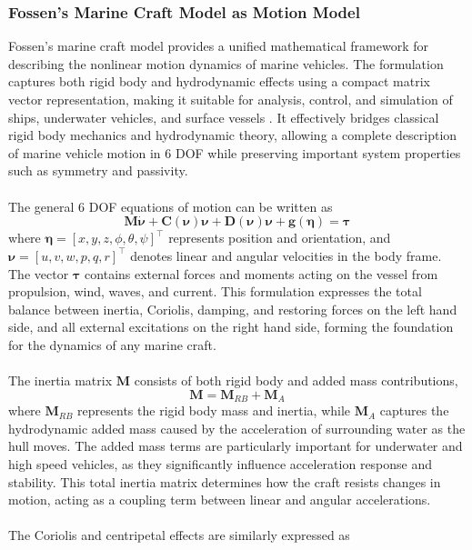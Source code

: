 \subsubsection{Fossen's Marine Craft Model as Motion Model}
Fossen's marine craft model provides a unified mathematical framework for describing the nonlinear motion dynamics of marine vehicles. The formulation captures both rigid body and hydrodynamic effects using a compact matrix vector representation, making it suitable for analysis, control, and simulation of ships, underwater vehicles, and surface vessels \cite{fossen_marine_craft_model}. It effectively bridges classical rigid body mechanics and hydrodynamic theory, allowing a complete description of marine vehicle motion in 6 DOF while preserving important system properties such as symmetry and passivity.  
\\ \\
The general 6 DOF equations of motion can be written as
$$
    \mathbf{M}\dot{\boldsymbol{\nu}} + \mathbf{C}(\boldsymbol{\nu})\boldsymbol{\nu} + \mathbf{D}(\boldsymbol{\nu})\boldsymbol{\nu} + \mathbf{g}(\boldsymbol{\eta}) = \boldsymbol{\tau}
$$
where $\boldsymbol{\eta} = [x, y, z, \phi, \theta, \psi]^\top$ represents position and orientation, and $\boldsymbol{\nu} = [u, v, w, p, q, r]^\top$ denotes linear and angular velocities in the body frame. The vector $\boldsymbol{\tau}$ contains external forces and moments acting on the vessel from propulsion, wind, waves, and current. This formulation expresses the total balance between inertia, Coriolis, damping, and restoring forces on the left hand side, and all external excitations on the right hand side, forming the foundation for the dynamics of any marine craft.  
\\ \\
The inertia matrix $\mathbf{M}$ consists of both rigid body and added mass contributions,
$$
    \mathbf{M} = \mathbf{M}_{RB} + \mathbf{M}_A
$$
where $\mathbf{M}_{RB}$ represents the rigid body mass and inertia, while $\mathbf{M}_A$ captures the hydrodynamic added mass caused by the acceleration of surrounding water as the hull moves. The added mass terms are particularly important for underwater and high speed vehicles, as they significantly influence acceleration response and stability. This total inertia matrix determines how the craft resists changes in motion, acting as a coupling term between linear and angular accelerations.  
\\ \\
The Coriolis and centripetal effects are similarly expressed as
